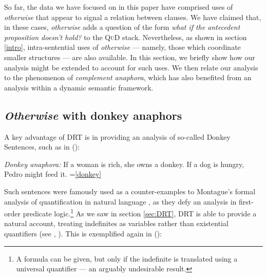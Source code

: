 So far, the data we have focused on in this paper have comprised uses of \textit{otherwise} that appear to signal a relation between clauses. We have claimed that, in these cases, \textit{otherwise} adds a question of the form \textit{what if the antecedent proposition doesn't hold?} to the \textsc{QuD} stack. Nevertheless, as shown in section \ref{intro}, intra-sentential uses of \textit{otherwise} --- namely, those which coordinate smaller structures --- are also available. In this section, we briefly show how our analysis might be extended to account for such uses. We then relate our analysis to the phenomenon of \textit{complement anaphora}, which has also benefited from an analysis within a dynamic semantic framework.





\subsection{\textit{Otherwise} with donkey anaphors} 
\label{sec:etype}


A key advantage of DRT is in providing an analysis of so-called Donkey Sentences, such as in (\nextx): 

\pex  \textit{Donkey anaphora:}
\a  If a woman is rich, she owns a donkey. 
\a  If a dog is hungry, Pedro might feed it.  \hfill =\ref{donkey}\xe

Such sentences were famously used as a counter-examples to Montague's formal analysis of quantification in natural language \citeyearpar{montague1973}, as they defy an analysis in first-order predicate logic.\footnote{A formula can be given, but only if the indefinite is translated using a universal quantifier --- an arguably undesirable result.} As we saw in section \ref{sec:DRT}, DRT is able to provide a natural account, treating indefinites as variables rather than existential quantifiers (see \citealt{Kamp1981}, \citealt{Heim}). This is exemplified again in (\nextx): 

\pex  {}
\xe


